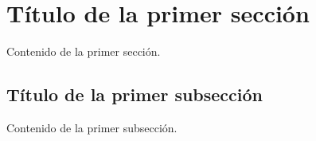 \section{T\'itulo de la primer secci\'on}

    Contenido de la primer secci\'on.

    \subsection{T\'itulo de la primer subsecci\'on}

	   Contenido de la primer subsecci\'on.

	
